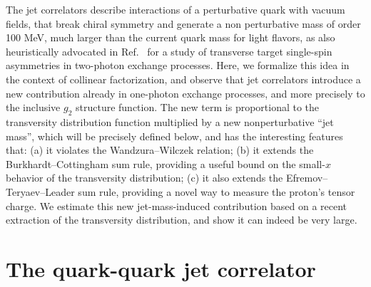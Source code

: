 \documentclass[preprintnumbers,floatfix,nofootinbib]{revtex4}
\begin{document}
The jet correlators describe interactions of a perturbative quark with vacuum fields, that break chiral symmetry and generate a non perturbative mass of order 100 MeV, much larger than the current quark mass for light flavors, as also heuristically advocated in Ref.~\cite{Afanasev:2007ii} for a study of transverse target single-spin asymmetries in two-photon exchange processes. Here, we formalize this idea in the context of collinear factorization, and observe that jet correlators introduce a new
contribution already in one-photon exchange processes, and more precisely to the inclusive $g_2$ structure function. The new term is proportional to the transversity distribution function multiplied by a new nonperturbative ``jet mass'', which will be precisely defined below, and has the interesting features that:
(a) it violates the Wandzura--Wilczek relation;
(b) it extends the Burkhardt--Cottingham sum rule, providing a useful bound on the small-$x$ behavior of the transversity distribution;
(c) it also extends the Efremov--Teryaev--Leader sum rule, providing a novel way to measure the proton's tensor charge.
We estimate this new jet-mass-induced contribution based on a recent extraction of the transversity distribution, and show it can indeed be very large.   
 

\section{The quark-quark jet correlator}
\end{document}
